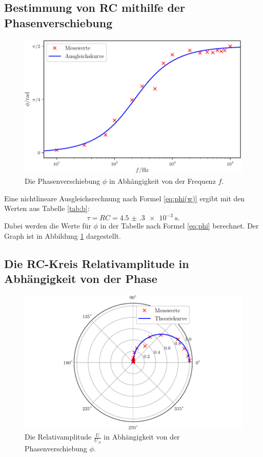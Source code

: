 \subsection{Bestimmung von RC mithilfe der Phasenverschiebung}
\begin{figure}
	\centering
	\includegraphics[width=\linewidth-70pt,height=\textheight-70pt,keepaspectratio]{content/images/Graph3.pdf}
	\caption{Die Phasenverschiebung $\phi$ in Abhängigkeit von der Frequenz $f$.}
	\label{fig:Graph3}
\end{figure}

\noindent Eine nichtlineare Ausgleichsrechnung nach Formel \eqref{eq:phi(w)} ergibt mit den Werten aus Tabelle \ref{tab:b}:
\[
\tau = RC = \SI{4.5(3)e-3}{\second}\text{.}
\]
Dabei werden die Werte für $\phi$ in der Tabelle nach Formel \eqref{eq:phi} berechnet. Der Graph ist in Abbildung \ref{fig:Graph3} dargestellt.

\subsection{Die RC-Kreis Relativamplitude in Abhängigkeit von der Phase}
\begin{figure}
	\centering
	\includegraphics[width=\linewidth-70pt,height=\textheight-70pt,keepaspectratio]{content/images/Graph4.pdf}
	\caption{Die Relativamplitude $\frac{U}{U_.0}$ in Abhängigkeit von der Phasenverschiebung $\phi$.}
	\label{fig:Graph4}
\end{figure}

